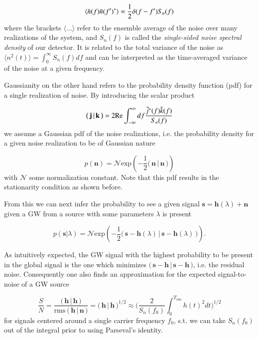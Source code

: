 \documentclass{aa}
\begin{document}
\begin{equation}
\langle \Tilde{n}(f) \Tilde{n}(f')^* \rangle = \frac{1}{2} \delta (f-f') S_n(f)
\end{equation}    
where the brackets $\langle \dots \rangle$ refer to the ensemble average of the noise over many realizations of the system, and $S_n(f)$ is called the \textit{single-sided noise spectral density} of our detector. It is related to the total variance of the noise as $\langle n^2(t) \rangle=\int^\infty_0 S_n(f)df$ and can be interpreted as the time-averaged variance of the noise at a given frequency.

Gaussianity on the other hand refers to the probability density function (pdf) for a single realization of noise. By introducing the scalar product

\begin{equation} \label{eq:innerprod}
\big(\, \mathbf{j}\,|\,\mathbf{k}\,\big)=2\mathrm{Re}\int^\infty_{-\infty} df\frac{\Tilde{j}^*(f)\Tilde{k}(f)}{S_n(f)}
\end{equation}   
we assume a Gaussian pdf of the noise realizations, i.e. the probability density for a given noise realization to be of Gaussian nature

\begin{equation}
    p(\mathbf{n}) = \mathcal{N} \mathrm{exp}\left(-\frac{1}{2}\big(\, \mathbf{n}\,|\,\mathbf{n}\,\big)\right)
\end{equation}    
with $\mathcal{N}$ some normalization constant. Note that this pdf results in the stationarity condition as shown before.

From this we can next infer the probability to see a given signal $\mathbf{s}=\mathbf{h}(\lambda)+\mathbf{n}$ given a GW from a source with some parameters $\lambda$ is present

\begin{equation}
    p(\mathbf{s}|\lambda)=\mathcal{N} \mathrm{exp}\left(-\frac{1}{2}\big(\, \mathbf{s}-\mathbf{h}(\lambda)\,|\,\mathbf{s}-\mathbf{h}(\lambda)\,\big)\right).
\end{equation}    

As intuitively expected, the GW signal with the highest probability to be present in the global signal is the one which minimizes $\big(\, \mathbf{s}-\mathbf{h}\,|\,\mathbf{s}-\mathbf{h}\, \big)$, i.e. the residual noise. Consequently one also finds an approximation for the expected signal-to-noise of a GW source

\begin{equation} \label{eq:snr}
    \frac{S}{N}=\frac{\big(\, \mathbf{h}\,|\,\mathbf{h}\,\big)}{\mathrm{rms}\  \big(\, \mathbf{h}\,|\,\mathbf{n}\,\big)} = \big(\, \mathbf{h}\,|\,\mathbf{h}\,\big)^{1/2} \approx \Bigg( \frac{2}{S_n(f_0)} \int_0^{T_\mathrm{obs}} h(t)^2dt \Bigg)^{1/2}
\end{equation}    
for signals centered around a single carrier frequency $f_0$, s.t. we can take $S_n(f_0)$ out of the integral prior to using Parseval's identity.
\end{document}

